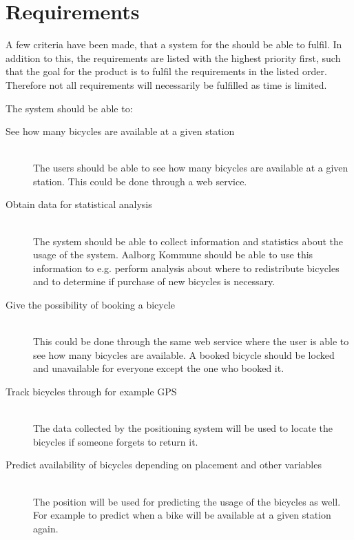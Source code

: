 \section{Requirements}
A few criteria have been made, that a system for the \bycykel should be able to fulfil. 
In addition to this, the requirements are listed with the highest priority first, such that the goal for the product is to fulfil the requirements in the listed order. 
Therefore not all requirements will necessarily be fulfilled as time is limited.

The system should be able to:
\begin{description}
\item[See how many bicycles are available at a given station] \hfill \\
The users should be able to see how many bicycles are available at a given station.
This could be done through a web service.
\item[Obtain data for statistical analysis] \hfill \\
The system should be able to collect information and statistics about the usage of the system.
Aalborg Kommune should be able to use this information to e.g. perform analysis about where to redistribute bicycles and to determine if purchase of new bicycles is necessary.
\item[Give the possibility of booking a bicycle] \hfill \\
This could be done through the same web service where the user is able to see how many bicycles are available.
A booked bicycle should be locked and unavailable for everyone except the one who booked it.
\item[Track bicycles through for example GPS] \hfill \\
The data collected by the positioning system will be used to locate the bicycles if someone forgets to return it.
\item[Predict availability of bicycles depending on placement and other variables] \hfill \\
The position will be used for predicting the usage of the bicycles as well. 
For example to predict when a bike will be available at a given station again.
\end{description}